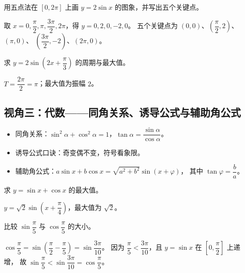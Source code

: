 \begin{explore}
\begin{example}
用五点法在 $[0,2\pi]$ 上画 $y=2\sin x$ 的图象，并写出五个关键点。
\end{example}
\begin{solution}
取 $x=0,\dfrac{\pi}{2},\pi,\dfrac{3\pi}{2},2\pi$，得 $y=0,2,0,-2,0$。
五个关键点为 $(0,0)$、$\left(\dfrac{\pi}{2},2\right)$、$(\pi,0)$、
$\left(\dfrac{3\pi}{2},-2\right)$、$(2\pi,0)$。
\end{solution}

\begin{problem}
求 $y=2\sin\left(2x+\dfrac{\pi}{3}\right)$ 的周期与最大值。
\end{problem}
\begin{solution}
$T=\dfrac{2\pi}{2}=\pi$；最大值为振幅 $2$。
\end{solution}

\subsection{视角三：代数——同角关系、诱导公式与辅助角公式}

\begin{itemize}
  \item 同角关系：$\sin^2\alpha+\cos^2\alpha=1$，$\tan\alpha=\dfrac{\sin\alpha}{\cos\alpha}$。
  \item 诱导公式口诀：奇变偶不变，符号看象限。
  \item 辅助角公式：$a\sin x+b\cos x=\sqrt{a^2+b^2}\sin(x+\varphi)$，
        其中 $\tan\varphi=\dfrac ba$。
\end{itemize}

\begin{example}
求 $y=\sin x+\cos x$ 的最大值。
\end{example}
\begin{solution}
$y=\sqrt2\sin\left(x+\dfrac{\pi}{4}\right)$，最大值为 $\sqrt2$。
\end{solution}

\begin{example}
比较 $\sin\dfrac{\pi}{5}$ 与 $\cos\dfrac{\pi}{5}$ 的大小。
\end{example}
\begin{solution}
$\cos\dfrac{\pi}{5}=\sin\left(\dfrac{\pi}{2}-\dfrac{\pi}{5}\right)=\sin\dfrac{3\pi}{10}$。
因为 $\dfrac{\pi}{5}<\dfrac{3\pi}{10}$，且 $y=\sin x$ 在 $\left[0,\dfrac{\pi}{2}\right]$ 上递增，
故 $\sin\dfrac{\pi}{5}<\sin\dfrac{3\pi}{10}=\cos\dfrac{\pi}{5}$。
\end{solution}


\end{explore}
